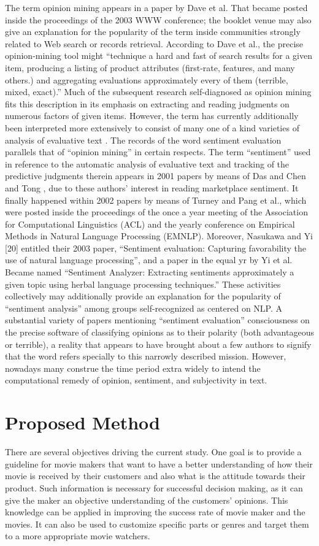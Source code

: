 \documentclass[conference]{IEEEtran}
\begin{document}
The term opinion mining appears in a paper by Dave et al. That became posted inside the proceedings of the 2003 WWW conference; the booklet venue may also give an explanation for the popularity of the term inside communities strongly related to Web search or records retrieval. According to Dave et al., the precise opinion-mining tool might “technique a hard and fast of search results for a given item, producing a listing of product attributes (first-rate, features, and many others.) and aggregating evaluations approximately every of them (terrible, mixed, exact).” Much of the subsequent research self-diagnosed as opinion mining fits this description in its emphasis on extracting and reading judgments on numerous factors
of given items. However, the term has currently additionally been interpreted more extensively to consist of many one of a kind varieties of analysis of evaluative text .
The records of the word sentiment evaluation parallels that of “opinion mining” in certain respects. The term “sentiment” used in reference to the automatic analysis of evaluative text and tracking of the predictive judgments therein appears in 2001 papers by means of Das and Chen and Tong , due to these authors’ interest in reading marketplace sentiment. It finally happened within 2002 papers by means of Turney and Pang et al., which were posted inside the proceedings of the once a year meeting of the Association for Computational Linguistics (ACL) and the yearly conference on Empirical Methods in Natural Language Processing (EMNLP). Moreover, Nasukawa and Yi [20] entitled their 2003 paper, “Sentiment evaluation: Capturing favorability the use of natural language processing”, and a paper in the equal yr by Yi et al.  Became named “Sentiment Analyzer: Extracting sentiments approximately a given topic using herbal language processing techniques.” These activities collectively may additionally provide an explanation for the popularity of “sentiment analysis” among groups self-recognized as centered on NLP. A substantial variety of papers mentioning “sentiment evaluation” consciousness on the precise software of
classifying opinions as to their polarity (both advantageous or terrible), a reality that appears to have brought about a few authors to signify that the word refers specially to this narrowly described mission. However, nowadays many construe the time period extra widely to intend the computational remedy of opinion, sentiment, and subjectivity in text.


\section{Proposed Method}
There are several objectives driving the current study. One goal is to provide a guideline for movie makers
that want to have a better understanding of how their movie is received by their customers and also what is
the attitude towards their product. Such information is necessary for successful decision making,
as it can give the maker an objective understanding of the customers’ opinions. This knowledge can be applied in improving the success rate of movie maker and the movies. It can also be used to customize specific parts or genres and target them to a more appropriate movie watchers.
\end{document}
